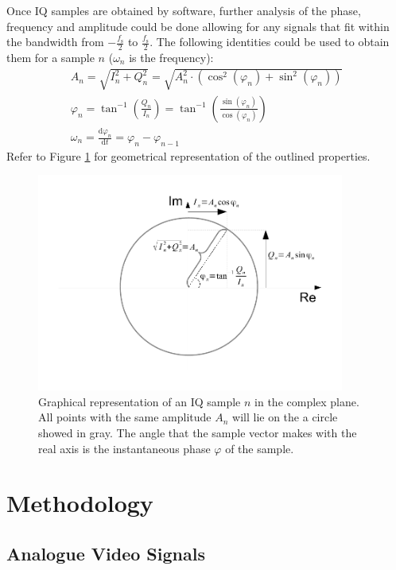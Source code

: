 \documentclass[a4paper,12pt,twoside,openright]{report}
\begin{document}
Once IQ samples are obtained by software, further analysis of the phase, frequency and amplitude could be done allowing for any signals that fit within the bandwidth from $-\frac{f_\text{s}}{2}$ to $\frac{f_\text{s}}{2}$. The following identities could be used to obtain them for a sample $n$ ($\omega_{n}$ is the frequency):
\begin{subequations}
\begin{align}
A_{n} = \sqrt{I_n^2+Q_n^2} = \sqrt{A_{n}^2 \cdot (\cos^2(\varphi_n) + \sin^2(\varphi_n))} \\
\varphi_{n} = \tan^{-1}\left(\frac{Q_{n}}{I_{n}}\right) = \tan^{-1}\left(\frac{\sin(\varphi_{n})}{\cos(\varphi_{n})}\right) \\
\omega_{n} = \frac{\text{d} \varphi_{n}}{\text{d} t} = \varphi_{n} - \varphi_{n-1}
\end{align}
\end{subequations}
Refer to Figure \ref{fig:IQ} for geometrical representation of the outlined properties.

\begin{figure}
\centering
\includegraphics[width=0.9\textwidth]{iqdrawing}
  \caption{Graphical representation of an IQ sample $n$ in the complex plane. All points with the same amplitude $A_{n}$ will lie on the a circle showed in gray. The angle that the sample vector makes with the real axis is the instantaneous phase $\varphi$ of the sample.}
  \label{fig:IQ}
\end{figure}

\chapter{Methodology} 

\section{Analogue Video Signals}
\end{document}

